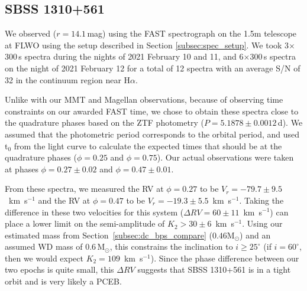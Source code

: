 \documentclass[twocolumn]{aastex631}
\begin{document}
\subsection{SBSS 1310+561}\label{subsec:SBSS1310+561}

We observed  ($r=14.1$\,mag) using the FAST spectrograph on the 1.5m telescope at FLWO using the setup described in Section \ref{subsec:spec_setup}. We took 3$\times$300\,s spectra during the nights of 2021 February 10 and 11, and 6$\times$300\,s spectra on the night of 2021 February 12 for a total of 12 spectra with an average S/N of 32 in the continuum region near H$\alpha$.

Unlike with our MMT and Magellan observations, because of observing time constraints on our awarded FAST time, we chose to obtain these spectra close to the quadrature phases based on the ZTF photometry ($P=5.1878\pm0.0012$\,d). We assumed that the photometric period corresponds to the orbital period, and used t$_0$ from the light curve to calculate the expected times that   should be at the quadrature phases ($\phi=0.25$ and $\phi=0.75$). Our actual observations were taken at phases $\phi=0.27\pm0.02$ and $\phi=0.47\pm0.01$.

From these spectra, we measured the RV at $\phi=0.27$ to be  $V_r =-79.7 \pm 9.5$~km~s$^{-1}$ and the RV at $\phi=0.47$ to be $V_r = -19.3 \pm 5.5$~km~s$^{-1}$. Taking the difference in these two velocities for this system ($\Delta RV = 60\pm11$~km~s$^{-1}$) can place a lower limit on the semi-amplitude of $K_{2} > 30 \pm 6$~km~s$^{-1}$. Using our estimated mass from Section~\ref{subsec:dc_bps_compare} ($0.46$M$_{\odot}$) and an assumed WD mass of $0.6$\,M$_{\odot}$, this constrains the inclination to $i \geq 25^\circ$ (if $i = 60^\circ$, then we would expect $K_2 = 109$~km~s$^{-1}$). Since the phase difference between our two epochs is quite small, this $\Delta RV$ suggests that SBSS 1310+561 is in a tight orbit and is very likely a PCEB.

\end{document}
